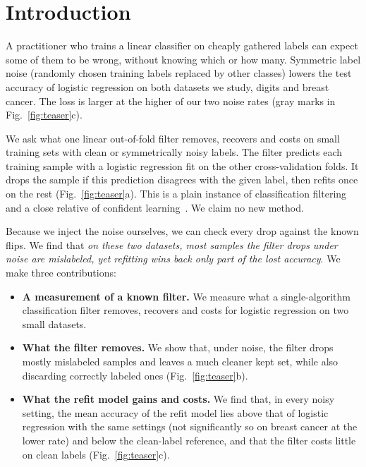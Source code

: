 \section{Introduction}\label{sec:intro}

A practitioner who trains a linear classifier on cheaply gathered labels can expect some of them to be wrong, without knowing which or how many. Symmetric label noise (randomly chosen training labels replaced by other classes) lowers the test accuracy of logistic regression on both datasets we study, digits and breast cancer. The loss is larger at the higher of our two noise rates (gray marks in Fig.~\ref{fig:teaser}c).

We ask what one linear out-of-fold filter removes, recovers and costs on small training sets with clean or symmetrically noisy labels. The filter predicts each training sample with a logistic regression fit on the other cross-validation folds. It drops the sample if this prediction disagrees with the given label, then refits once on the rest (Fig.~\ref{fig:teaser}a). This is a plain instance of classification filtering~\citep{brodley1999identifying} and a close relative of confident learning~\citep{northcutt2021confident}. We claim no new method.

Because we inject the noise ourselves, we can check every drop against the known flips. We find that \emph{on these two datasets, most samples the filter drops under noise are mislabeled, yet refitting wins back only part of the lost accuracy}. We make three contributions:
\begin{itemize}
  \item \textbf{A measurement of a known filter.} We measure what a single-algorithm classification filter removes, recovers and costs for logistic regression on two small datasets.
  \item \textbf{What the filter removes.} We show that, under noise, the filter drops mostly mislabeled samples and leaves a much cleaner kept set, while also discarding correctly labeled ones (Fig.~\ref{fig:teaser}b).
  \item \textbf{What the refit model gains and costs.} We find that, in every noisy setting, the mean accuracy of the refit model lies above that of logistic regression with the same settings (not significantly so on breast cancer at the lower rate) and below the clean-label reference, and that the filter costs little on clean labels (Fig.~\ref{fig:teaser}c).
\end{itemize}
